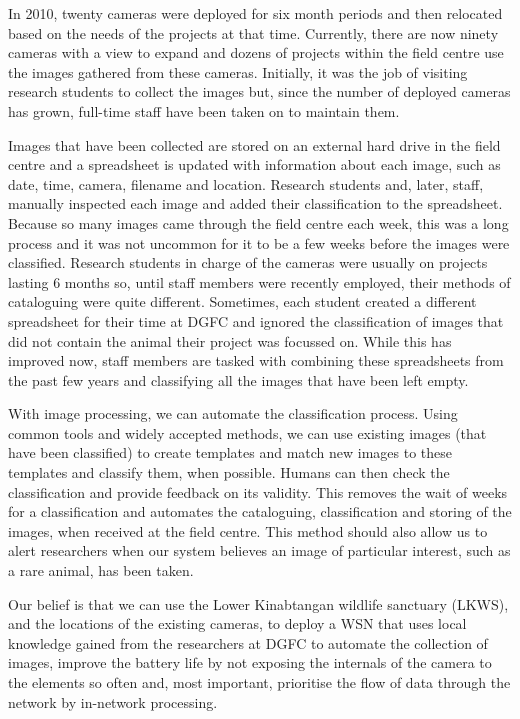 In 2010, twenty cameras were deployed for six month periods and then relocated based on the needs of the projects at that time. Currently, there are now ninety cameras with a view to expand and dozens of projects within the field centre use the images gathered from these cameras. Initially, it was the job of visiting research students to collect the images but, since the number of deployed cameras has grown, full-time staff have been taken on to maintain them.

Images that have been collected are stored on an external hard drive in the field centre and a spreadsheet is updated with information about each image, such as date, time, camera, filename and location. Research students and, later, staff, manually inspected each image and added their classification to the spreadsheet. Because so many images came through the field centre each week, this was a long process and it was not uncommon for it to be a few weeks before the images were classified. Research students in charge of the cameras were usually on projects lasting 6 months so, until staff members were recently employed, their methods of cataloguing were quite different. Sometimes, each student created a different spreadsheet for their time at DGFC and ignored the classification of images that did not contain the animal their project was focussed on. While this has improved now, staff members are tasked with combining these spreadsheets from the past few years and classifying all the images that have been left empty.

With image processing, we can automate the classification process. Using common tools and widely accepted methods, we can use existing images (that have been classified) to create templates and match new images to these templates and classify them, when possible. Humans can then check the classification and provide feedback on its validity. This removes the wait of weeks for a classification and automates the cataloguing, classification and storing of the images, when received at the field centre. This method should also allow us to alert researchers when our system believes an image of particular interest, such as a rare animal, has been taken.

Our belief is that we can use the Lower Kinabtangan wildlife sanctuary (LKWS), and the locations of the existing cameras, to deploy a WSN that uses local knowledge gained from the researchers at DGFC to automate the collection of images, improve the battery life by not exposing the internals of the camera to the elements so often and, most important, prioritise the flow of data through the network by in-network processing. 
	
